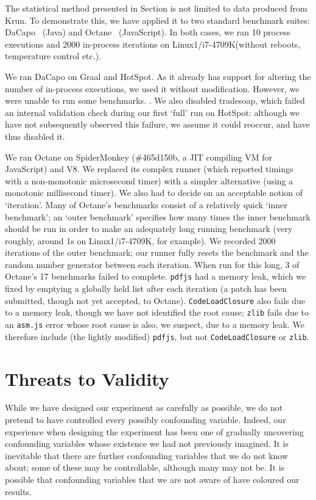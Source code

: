 \documentclass[preprint,numbers,10pt]{sigplanconf}
\newcommand{\bencherthree}{Linux1/i7-4709K\xspace}
\begin{document}
The statistical method presented in Section  is not limited to data
produced from Krun. To demonstrate this, we have applied it to two standard
benchmark suites: DaCapo~\cite{dacapo06} (Java) and Octane~
(JavaScript). In both cases, we ran 10 process executions and 2000 in-process
iterations on \bencherthree (without reboots, temperature control etc.).

We ran DaCapo on Graal and HotSpot. As it already has support for
altering the number of in-process executions, we used it without modification.
However, we were unable to run some benchmarks. . We also disabled tradesoap, which
failed an internal validation check during our first `full' run on HotSpot:
although we have not subsequently observed this failure, we assume it could
reoccur, and have thus disabled it.

We ran Octane on SpiderMonkey (\#465d150b, a JIT compiling VM for JavaScript) and V8. 
We replaced its complex runner (which reported timings with a non-monotonic
microsecond timer) with a simpler alternative (using a monotonic millisecond
timer). We also had to decide on an acceptable notion of `iteration'. Many of Octane's
benchmarks consist of a relatively quick `inner benchmark'; an `outer benchmark'
specifies how many times the inner benchmark should be run in order to make an
adequately long running benchmark (very roughly, around 1s on \bencherthree, for
example). We recorded 2000 iterations of the outer benchmark; our runner
fully resets the benchmark and the random number generator between each
iteration. When run for this long, 3 of
Octane's 17 benchmarks failed to complete. \texttt{pdfjs} had a memory leak,
which we fixed by emptying a globally held list after each iteration
(a patch has been submitted, though
not yet accepted, to Octane). \texttt{CodeLoadClosure} also
fails due to a memory leak, though we have not identified the root cause;
\texttt{zlib} fails due to an \texttt{asm.js} error whose root cause is also, we
suspect, due to a memory leak. We therefore include (the lightly modified)
\texttt{pdfjs}, but not \texttt{CodeLoadClosure} or \texttt{zlib}.


\section{Threats to Validity}
\label{sec:threats}

While we have designed our experiment as carefully as possible, we do not
pretend to have controlled every possibly confounding variable. Indeed, our
experience when designing the experiment has been one of gradually uncovering
confounding variables whose existence we had not previously imagined. It
is inevitable that there are further confounding variables that we
do not know about; some of these may be controllable, although many may not be.
It is possible that confounding variables that we are not aware of have
coloured our results.
\end{document}
